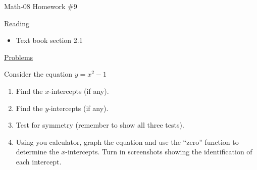 \documentclass[letterpaper,12pt,fleqn]{article}
\begin{document}
\begin{center}
\Large Math-08 Homework \#9
\end{center}

\vspace{0.5in}

\underline{Reading}

\begin{itemize}
\item Text book section 2.1
\end{itemize}

\underline{Problems}

Consider the equation $y=x^2-1$
\begin{enumerate}
\item Find the $x$-intercepts (if any).
\item Find the $y$-intercepts (if any).
\item Test for symmetry (remember to show all three tests).
\item Using you calculator, graph the equation and use the ``zero'' function
  to determine the $x$-intercepts. Turn in screenshots showing the
  identification of each intercept.
\end{enumerate}
\end{document}
